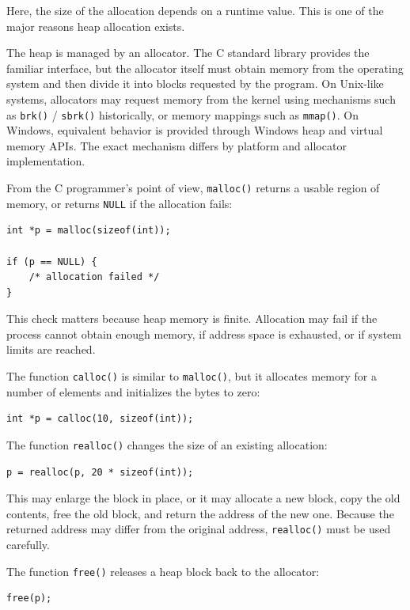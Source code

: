 Here, the size of the allocation depends on a runtime value. This is one of the major reasons heap allocation exists.

The heap is managed by an allocator. The C standard library provides the familiar interface, but the allocator itself must obtain memory from the operating system and then divide it into blocks requested by the program. On Unix-like systems, allocators may request memory from the kernel using mechanisms such as \texttt{brk()} / \texttt{sbrk()} historically, or memory mappings such as \texttt{mmap()}. On Windows, equivalent behavior is provided through Windows heap and virtual memory APIs. The exact mechanism differs by platform and allocator implementation.

From the C programmer's point of view, \texttt{malloc()} returns a usable region of memory, or returns \texttt{NULL} if the allocation fails:

\begin{verbatim}
int *p = malloc(sizeof(int));

if (p == NULL) {
    /* allocation failed */
}
\end{verbatim}

This check matters because heap memory is finite. Allocation may fail if the process cannot obtain enough memory, if address space is exhausted, or if system limits are reached.

The function \texttt{calloc()} is similar to \texttt{malloc()}, but it allocates memory for a number of elements and initializes the bytes to zero:

\begin{verbatim}
int *p = calloc(10, sizeof(int));
\end{verbatim}

The function \texttt{realloc()} changes the size of an existing allocation:

\begin{verbatim}
p = realloc(p, 20 * sizeof(int));
\end{verbatim}

This may enlarge the block in place, or it may allocate a new block, copy the old contents, free the old block, and return the address of the new one. Because the returned address may differ from the original address, \texttt{realloc()} must be used carefully.

The function \texttt{free()} releases a heap block back to the allocator:

\begin{verbatim}
free(p);
\end{verbatim}

